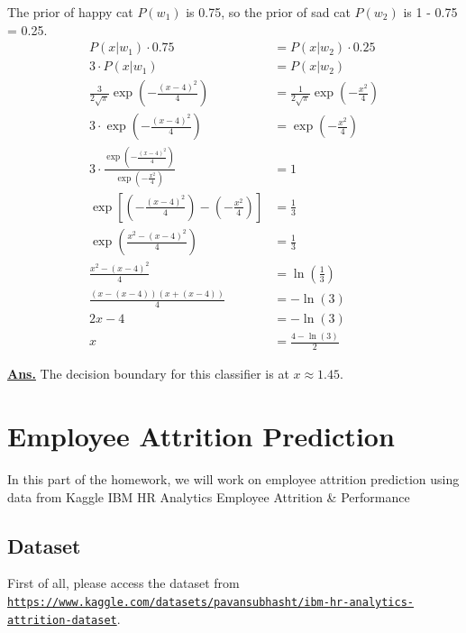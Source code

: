 \documentclass[12pt, a4paper]{article}
\newcommand{\ans}{\par\noindent\underline{\textbf{Ans.}} }
\begin{document}
            The prior of happy cat $P(w_1)$ is 0.75, so the prior of sad cat $P(w_2)$ is 1 - 0.75 = 0.25.
            \begin{align*}
                P(x|w_1) \cdot 0.75 &= P(x|w_2) \cdot 0.25 \\
                3 \cdot P(x|w_1) &= P(x|w_2) \\[1em]
                \frac{3}{2\sqrt{\pi}} \exp\left( -\frac{(x - 4)^{2}}{4} \right) &= \frac{1}{2\sqrt{\pi}} \exp\left( -\frac{{x}^{2}}{4} \right) \\[1em]
                3 \cdot \exp\left( -\frac{(x - 4)^{2}}{4} \right) &= \exp\left( -\frac{{x}^{2}}{4} \right) \\[1em]
                3 \cdot \frac{\exp\left( -\frac{(x - 4)^{2}}{4} \right)}{\exp\left( -\frac{{x}^{2}}{4} \right)} &= 1 \\[1em]
                \exp\left[ \left( -\frac{(x - 4)^{2}}{4} \right) - \left( -\frac{{x}^{2}}{4} \right) \right] &= \frac{1}{3} \\[1em]
                \exp\left( \frac{{x}^{2} - (x - 4)^{2}}{4} \right) &= \frac{1}{3} \\[1em]
                \frac{{x}^{2} - (x - 4)^{2}}{4} &= \ln\left( \frac{1}{3} \right) \\[1em]
                \frac{(x - (x - 4))(x + (x - 4))}{4} &= -\ln(3) \\
                2x - 4 &= -\ln(3) \\
                x &= \frac{4 -\ln(3)}{2}
            \end{align*}

            \ans The decision boundary for this classifier is at $x \approx 1.45$.

    \pagebreak

    \section{Employee Attrition Prediction}

        In this part of the homework, we will work on employee attrition prediction using data from Kaggle IBM HR Analytics Employee Attrition \& Performance
    
        \subsection{Dataset}

            First of all, please access the dataset from \texttt{\url{https://www.kaggle.com/datasets/pavansubhasht/ibm-hr-analytics-attrition-dataset}}.
            \vspace{0.5em}
\end{document}
